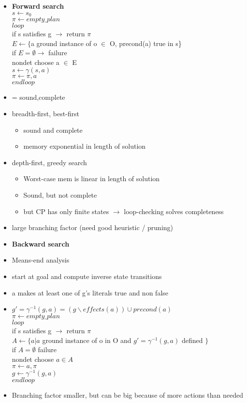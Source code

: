 \begin{itemize}
\item \textbf{Forward search}
\\
$s \leftarrow s_0$\\
$\pi \leftarrow empty\_plan$\\
$loop$\\
if s satisfies g $\rightarrow$ return $\pi$\\
$E \leftarrow \{$a ground instance of o $\in$ O, precond(a) true in s\}\\
if $E=\emptyset \rightarrow$ failure\\
nondet choose a $\in$ E\\
$s \leftarrow \gamma(s,a)$\\
$\pi \leftarrow \pi,a$\\
$endloop$
\item = sound,complete
\item breadth-first, best-first
	\begin{itemize}
	\item sound and complete
	\item memory exponential in length of solution
	\end{itemize}
\item depth-first, greedy search
	\begin{itemize}
	\item Worst-case mem is linear in length of solution
	\item Sound, but not complete 
	\item but CP has only finite states $\rightarrow$ loop-checking solves completeness
	\end{itemize}	
\item large branching factor (need good heuristic / pruning)

\item \textbf{Backward search}
\item Means-end analysis
\item start at goal and compute inverse state transitions 
\item a makes at least one of g's literals true and non false
\item $g' = \gamma^{-1}(g,a) = (g\backslash effects(a)) \cup precond(a)$
\\
$\pi \leftarrow empty\_plan$\\
$loop$\\
if s satisfies g $\rightarrow$ return $\pi$\\
$A \leftarrow \{ a|a$ ground instance of o in O and $g' = \gamma^{-1}(g,a)$ defined $\}$\\
if $A=\emptyset$ failure \\
nondet choose $a \in A$ \\
$\pi \leftarrow a,\pi$ \\
$g \leftarrow \gamma^{-1}(g,a)$ \\
$endloop$
\item Branching factor smaller, but can be big because of more actions than needed


\end{itemize}
